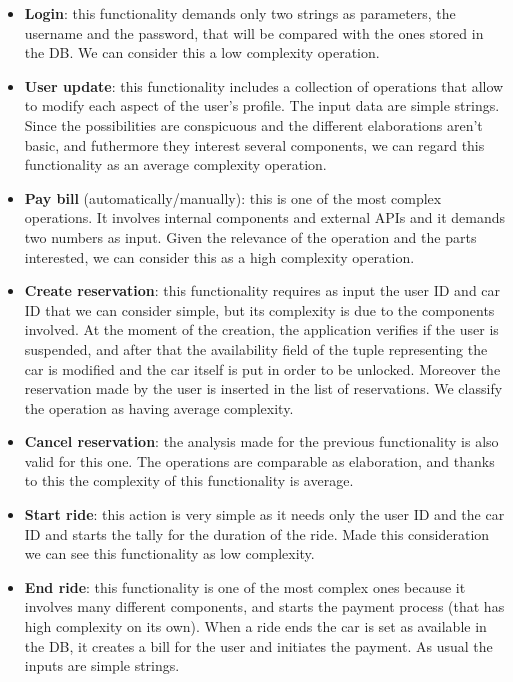 \documentclass[english]{article}
\begin{document}
\begin{itemize}

	\item{\textbf{Login}: this functionality demands only two strings as parameters, the username and the password, that will be compared with the ones stored in the DB. We can consider this a low complexity operation.}
	
	\item{\textbf{User update}: this functionality includes a collection of operations that allow to modify each aspect of the user's profile. The input data are simple strings. Since the possibilities are conspicuous and the different elaborations aren't basic, and futhermore they interest several components, we can regard this functionality as an average complexity operation.}
	
	\item{\textbf{Pay bill} (automatically/manually): this is one of the most complex operations. It involves internal components and external APIs and it demands two numbers as input. Given the relevance of the operation and the parts interested, we can consider this as a high complexity operation.}

	\item{\textbf{Create reservation}: this functionality requires as input the user ID and car ID that we can consider simple, but its complexity is due to the components involved. At the moment of the creation, the application verifies if the user is suspended, and after that the availability field of the tuple representing the car is modified and the car itself is put in order to be unlocked. Moreover the reservation made by the user is inserted in the list of reservations. We classify the operation as having average complexity.}

	\item{\textbf{Cancel reservation}: the analysis made for the previous functionality is also valid for this one. The operations are comparable as elaboration, and thanks to this the complexity of this functionality is average.}

	\item{\textbf{Start ride}: this action is very simple as it needs only the user ID and the car ID and starts the tally for the duration of the ride. Made this consideration we can see this functionality as low complexity.}

	\item{\textbf{End ride}: this functionality is one of the most complex ones because it involves many different components, and starts the payment process (that has high complexity on its own). When a ride ends the car is set as available in the DB, it creates a bill for the user and initiates the payment. As usual the inputs are simple strings.}


\end{itemize}
\end{document}
